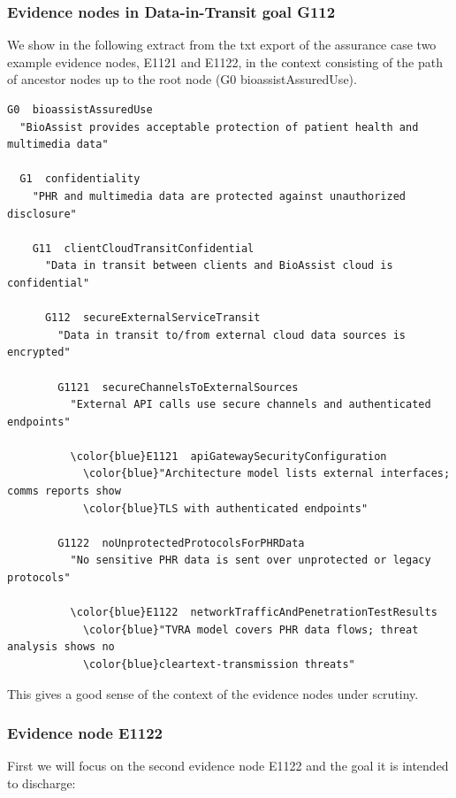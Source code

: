 \documentclass{article}
\begin{document}
\subsubsection{Evidence nodes in Data-in-Transit goal G112}
We show in the following extract from the txt export of the assurance case two example evidence nodes, E1121 and E1122, in the context consisting of the path of ancestor nodes up to the root node (G0 bioassistAssuredUse).
\begin{Verbatim}[commandchars=\\\{\}]
G0  bioassistAssuredUse
  "BioAssist provides acceptable protection of patient health and multimedia data"

  G1  confidentiality
    "PHR and multimedia data are protected against unauthorized disclosure"

    G11  clientCloudTransitConfidential
      "Data in transit between clients and BioAssist cloud is confidential"

      G112  secureExternalServiceTransit
        "Data in transit to/from external cloud data sources is encrypted"

        G1121  secureChannelsToExternalSources
          "External API calls use secure channels and authenticated endpoints"

          \color{blue}E1121  apiGatewaySecurityConfiguration
            \color{blue}"Architecture model lists external interfaces; comms reports show
            \color{blue}TLS with authenticated endpoints"

        G1122  noUnprotectedProtocolsForPHRData
          "No sensitive PHR data is sent over unprotected or legacy protocols"

          \color{blue}E1122  networkTrafficAndPenetrationTestResults
            \color{blue}"TVRA model covers PHR data flows; threat analysis shows no
            \color{blue}cleartext-transmission threats"
\end{Verbatim}
This gives a good sense of the context of the evidence nodes under scrutiny.

\subsubsection{Evidence node E1122}
First we will focus on the second evidence node E1122 and the goal it is intended to discharge:
\end{document}
